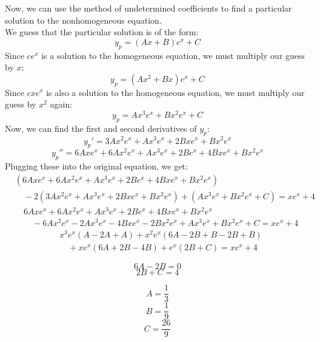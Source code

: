 \documentclass{article}
\begin{document}
Now, we can use the method of undetermined coefficients to find a particular solution to the nonhomogeneous equation.
\\We guess that the particular solution is of the form:
\[
y_p = (Ax + B)e^{x} + C
\]
Since $ce^{x}$ is a solution to the homogeneous equation, we must multiply our guess by $x$:
\[
y_p = (Ax^{2} + Bx)e^{x} + C
\]
Since $cxe^{x}$ is also a solution to the homogeneous equation, we must multiply our guess by $x^{2}$ again:
\[
y_p = Ax^{3}e^{x} + Bx^{2}e^{x} + C
\]
Now, we can find the first and second derivatives of $y_p$:
\[
y_p' = 3Ax^{2}e^{x} + Ax^{3}e^{x} + 2Bxe^{x} + Bx^{2}e^{x}
\]
\[
y_p'' = 6Axe^{x} + 6Ax^{2}e^{x} + Ax^{3}e^{x} + 2Be^{x} + 4Bxe^{x} + Bx^{2}e^{x}
\]
Plugging these into the original equation, we get:
\begin{align*}
    & (6Axe^{x} + 6Ax^{2}e^{x} + Ax^{3}e^{x} + 2Be^{x} + 4Bxe^{x} + Bx^{2}e^{x}) \\
    & \quad - 2(3Ax^{2}e^{x} + Ax^{3}e^{x} + 2Bxe^{x} + Bx^{2}e^{x}) + (Ax^{3}e^{x} + Bx^{2}e^{x} + C) = xe^{x} + 4
\end{align*}
\begin{align*}
    & 6Axe^{x} + 6Ax^{2}e^{x} + Ax^{3}e^{x} + 2Be^{x} + 4Bxe^{x} + Bx^{2}e^{x} \\
    & \quad - 6Ax^{2}e^{x} - 2Ax^{3}e^{x} - 4Bxe^{x} - 2Bx^{2}e^{x} + Ax^{3}e^{x} + Bx^{2}e^{x} + C = xe^{x} + 4
\end{align*}
\begin{align*}
    & x^{3}e^{x}(A - 2A + A) + x^{2}e^{x}(6A - 2B + B - 2B + B) \\
    & \quad + xe^{x}(6A + 2B - 4B) + e^{x}(2B + C) = xe^{x} + 4
\end{align*}

\[
    6A - 2B = 0
\]
\[
    2B + C = 4
\]

\[
    A = \frac{1}{3}
\]
\[
    B = \frac{1}{9}
\]
\[
    C = \frac{26}{9}
\]
\end{document}

